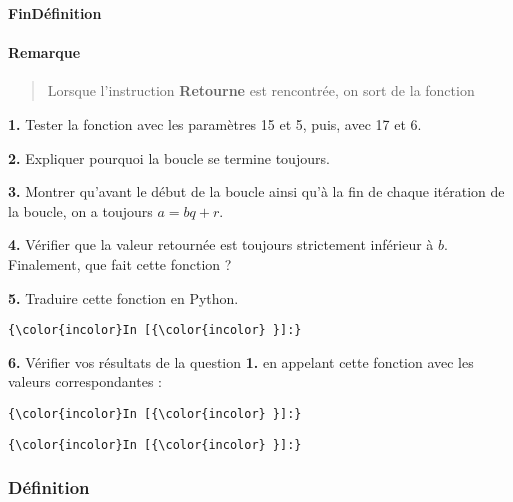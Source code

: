 \documentclass[11pt]{article}
\begin{document}
\textbf{FinDéfinition}

\hypertarget{remarque}{%
\paragraph{Remarque}\label{remarque}}

\begin{quote}
Lorsque l'instruction \textbf{Retourne} est rencontrée, on sort de la
fonction
\end{quote}

\textbf{1.} Tester la fonction avec les paramètres 15 et 5, puis, avec
17 et 6.

    

    \textbf{2.} Expliquer pourquoi la boucle se termine toujours.

    

    \textbf{3.} Montrer qu'avant le début de la boucle ainsi qu'à la fin de
chaque itération de la boucle, on a toujours \(a = bq + r\).

    

    \textbf{4.} Vérifier que la valeur retournée est toujours strictement
inférieur à \(b\). Finalement, que fait cette fonction ?

    

    \textbf{5.} Traduire cette fonction en Python.

    \begin{Verbatim}[commandchars=\\\{\}]
{\color{incolor}In [{\color{incolor} }]:} 
\end{Verbatim}

    \textbf{6.} Vérifier vos résultats de la question \textbf{1.} en
appelant cette fonction avec les valeurs correspondantes :

    \begin{Verbatim}[commandchars=\\\{\}]
{\color{incolor}In [{\color{incolor} }]:} 
\end{Verbatim}

    \begin{Verbatim}[commandchars=\\\{\}]
{\color{incolor}In [{\color{incolor} }]:} 
\end{Verbatim}

    \hypertarget{duxe9finition}{%
\subsubsection{Définition}\label{duxe9finition}}
\end{document}
